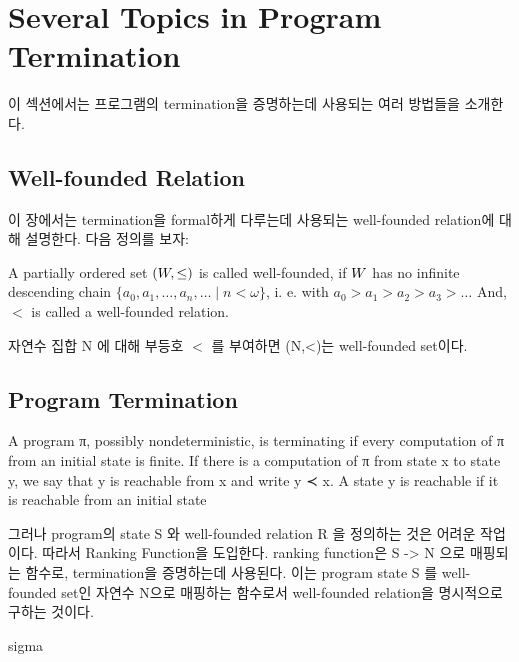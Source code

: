 \section{Several Topics in Program Termination}
이 섹션에서는 프로그램의 termination을 증명하는데 사용되는 여러 방법들을 소개한다.
\label{sec:topics}
\subsection{Well-founded Relation}
이 장에서는 termination을 formal하게 다루는데 사용되는 well-founded relation에 대해 설명한다.
다음 정의를 보자:~\cite{order}

\begin{definition}
    A partially ordered set $(\well, \leq)$ is called well-founded, 
    if $\well$ has no infinite descending chain $\{a_0, a_1, \dots, a_n, \dots \mid n < \omega\}$, i. e. with
    $a_0 > a_1 >a_2 > a_3 > \dots$ \newline
    And, $<$ is called a well-founded relation.
\end{definition}
\begin{example}
    자연수 집합 N 에 대해 부등호 $<$ 를 부여하면 (N,<)는 well-founded set이다.
\end{example}

\subsection{Program Termination}
A program π, possibly nondeterministic, is terminating if every computation of π
from an initial state is finite. If there is a computation of π from state x to state
y, we say that y is reachable from x and write y ≺ x. A state y is reachable if it
is reachable from an initial state ~\cite{term}


그러나 program의 state S 와 well-founded relation R 을 정의하는 것은 어려운 작업이다.
따라서 Ranking Function을 도입한다.
ranking function은 S -> N 으로 매핑되는 함수로, termination을 증명하는데 사용된다.
이는 program state S 를 well-founded set인 자연수 N으로 매핑하는 함수로서
well-founded relation을 명시적으로 구하는 것이다.

\begin{example}
    sigma
\end{example}
